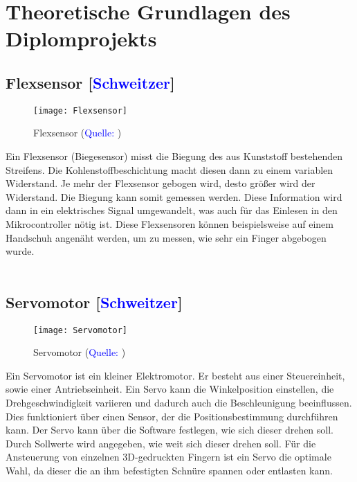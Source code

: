 \documentclass[titlepage,12pt,twoside]{article}
\begin{document}
\newpage
\section{Theoretische Grundlagen des Diplomprojekts}
\label{chap:Theoretische Grundlagen des Diplomprojekts}

\subsection{Flexsensor [\textcolor{blue}{Schweitzer}]}
\label{chap:Flexsensor}
\begin{figure}[H]
	\begin{center}
		\scalebox{0.6}
		{\texttt{[image: Flexsensor]}}
		\caption{Flexsensor (\textcolor{blue}{Quelle: \cite{Flexsensorabbildung}})}
		\label{fig:Flexsensor}
	\end{center}
\end{figure}
\hfill \break
Ein Flexsensor (Biegesensor) misst die Biegung des aus Kunststoff bestehenden 
Streifens. Die Kohlenstoffbeschichtung macht diesen dann zu einem variablen 
Widerstand. Je mehr der Flexsensor gebogen wird, desto größer wird der Widerstand. 
Die Biegung kann somit gemessen werden. Diese Information wird dann in ein 
elektrisches Signal umgewandelt, was auch für das Einlesen in den Mikrocontroller 
nötig ist. Diese Flexsensoren können beispielsweise auf einem Handschuh angenäht 
werden, um zu messen, wie sehr ein Finger abgebogen wurde. \\
\\

\subsection{Servomotor [\textcolor{blue}{Schweitzer}]}
\label{chap:Servomotor}
\begin{figure}[H]
	\begin{center}
		\scalebox{0.6}
		{\texttt{[image: Servomotor]}}
		\caption{Servomotor (\textcolor{blue}{Quelle: \cite{Servoabbildung}})}
		\label{fig:Servomotor}
	\end{center}
\end{figure}
\hfill \break
Ein Servomotor ist ein kleiner Elektromotor. Er besteht aus einer Steuereinheit, 
sowie einer Antriebseinheit. Ein Servo kann die Winkelposition einstellen, die 
Drehgeschwindigkeit variieren und dadurch auch die Beschleunigung beeinflussen. 
Dies funktioniert über einen Sensor, der die Positionsbestimmung durchführen kann. 
Der Servo kann über die Software festlegen, wie sich dieser drehen soll. Durch 
Sollwerte wird angegeben, wie weit sich dieser drehen soll. Für die Ansteuerung 
von einzelnen 3D-gedruckten Fingern ist ein Servo die optimale Wahl, da dieser 
die an ihm befestigten Schnüre spannen oder entlasten kann. \\
\\
\end{document}

